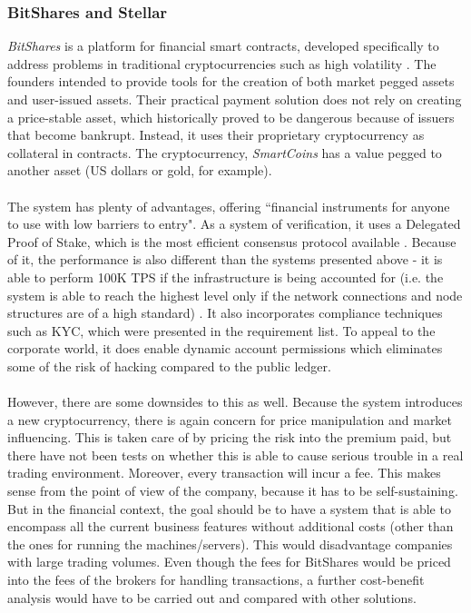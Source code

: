 \documentclass[12pt,twoside]{article}
\begin{document}
\subsubsection{BitShares and Stellar}
\label{sub:BSS}
\textit{BitShares} is a platform for financial smart contracts, developed specifically to address problems in traditional cryptocurrencies such as high volatility \cite{BS:TP}. The founders intended to provide tools for the creation of both market pegged assets and user-issued assets. Their practical payment solution does not rely on creating a price-stable asset, which historically proved to be dangerous because of issuers that become bankrupt. Instead, it uses their proprietary cryptocurrency as collateral in contracts. The cryptocurrency, \textit{SmartCoins} has a value pegged to another asset (US dollars or gold, for example). 
\\ \\
The system has plenty of advantages, offering ``financial instruments for anyone to use with low barriers to entry". As a system of verification, it uses a Delegated Proof of Stake, which is the most efficient consensus protocol available \cite{BS:DPOS}. Because of it, the performance is also different than the systems presented above - it is able to perform 100K TPS if the infrastructure is being accounted for (i.e. the system is able to reach the highest level only if the network connections and node structures are of a high standard) \cite{BS:tech}. It also incorporates compliance techniques such as KYC, which were presented in the requirement list. To appeal to the corporate world, it does enable dynamic account permissions which eliminates some of the risk of hacking compared to the public ledger. 
\\ \\
However, there are some downsides to this as well. Because the system introduces a new cryptocurrency, there is again concern for price manipulation and market influencing. This is taken care of by pricing the risk into the premium paid, but there have not been tests on whether this is able to cause serious trouble in a real trading environment. Moreover, every transaction will incur a fee. This makes sense from the point of view of the company, because it has to be self-sustaining. But in the financial context, the goal should be to have a system that is able to encompass all the current business features without additional costs (other than the ones for running the machines/servers). This would disadvantage companies with large trading volumes. Even though the fees for BitShares would be priced into the fees of the brokers for handling transactions, a further cost-benefit analysis would have to be carried out and compared with other solutions.
\end{document}
